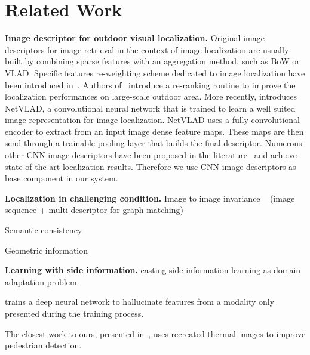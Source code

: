 \section{Related Work}
\label{sec:related_work}

\vspace{4pt}\noindent\textbf{Image descriptor for outdoor visual localization.} Original image descriptors for image retrieval in the context of image localization are usually built by combining sparse features with an aggregation method, such as BoW or VLAD. Specific features re-weighting scheme dedicated to image localization have been introduced in~\cite{Arandjelovic2014}. Authors of~\cite{Sattler2016} introduce a re-ranking routine to improve the localization performances on large-scale outdoor area. More recently, \cite{Arandjelovic2017} introduces NetVLAD, a convolutional neural network that is trained to learn a well suited image representation for image localization. NetVLAD uses a fully convolutional encoder to extract from an input image dense feature maps. These maps are then send through a trainable pooling layer that builds the final descriptor. Numerous other CNN image descriptors have been proposed in the literature~\cite{Kim2017a,Gordo2017,Radenovic2017,Sunderhauf2015a,Liu2018} and achieve state of the art localization results. Therefore we use CNN image descriptors as base component in our system.

\vspace{4pt}\noindent\textbf{Localization in challenging condition.} 
Image to image invariance  ~\cite{Naseer2018} (image sequence + multi descriptor for graph matching) ~\cite{Garg2018} ~\cite{Porav2018}

Semantic consistency ~\cite{Stenborg2018} ~\cite{Toft2018} ~\cite{Naseer2017a}

Geometric information ~\cite{Sattler2018} ~\cite{Torii2015} ~\cite{Schonberger2018} 

\vspace{4pt}\noindent\textbf{Learning with side information.} \cite{Li2017b} casting side information learning as domain adaptation problem.

\cite{Hoffman2016} trains a deep neural network to hallucinate features from a modality only presented during the training process.
 
The closest work to ours, presented in~\cite{xu2017learning}, uses recreated thermal images to improve pedestrian detection.
